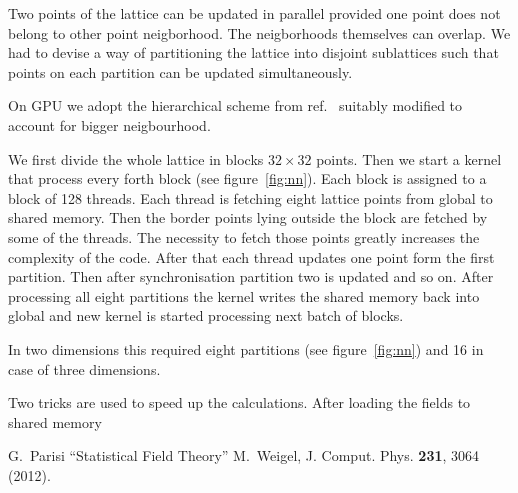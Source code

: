 \documentclass[a4paper]{llncs}
\begin{document}
Two points of the lattice can be updated in parallel provided one
point does not belong to other point neigborhood. The neigborhoods
themselves can overlap.  We had to devise a way of partitioning the
lattice into disjoint sublattices such that points on each partition
can be updated simultaneously. 

On GPU we adopt the hierarchical scheme from
ref.~\cite{weigel} suitably modified to account for bigger neigbourhood.

We first divide the whole lattice in blocks $32\times 32$
points. Then we start a kernel that process every forth block (see
figure~\ref{fig:nn}).  Each block is assigned to a block of 128
threads. Each thread is fetching eight lattice points from global to
shared memory. Then the border points lying outside the block are
fetched by some of the threads. The necessity to fetch those points
greatly increases the complexity of the code. After that each thread
updates one point form the first partition. Then after
synchronisation partition two is updated and so on. After processing
all eight partitions the kernel writes the shared memory back into
global and new kernel is started processing next batch of blocks.

In two dimensions this required eight partitions (see
figure~\ref{fig:nn}) and 16 in case of three dimensions.



Two tricks are used to speed up the calculations. After loading the
fields to shared memory 


\begin{thebibliography}{9}
 G.~Parisi ``Statistical Field Theory'' 
 M.~Weigel, J. Comput. Phys. \textbf{231}, 3064 (2012).
\end{thebibliography}
\end{document}

